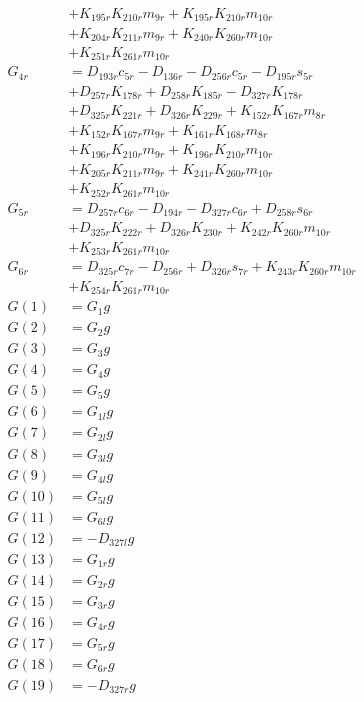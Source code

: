 \begin{multicols}{2}
\begin{align}
&+ K_{195r}K_{210r}m_{9r} + K_{195r}K_{210r}m_{10r}  \nonumber \\
&+ K_{204r}K_{211r}m_{9r} + K_{240r}K_{260r}m_{10r}  \nonumber \\
&+ K_{251r}K_{261r}m_{10r} \nonumber \\
G_{4r} &= D_{193r}c_{5r} - D_{136r} - D_{256r}c_{5r} - D_{195r}s_{5r}  \nonumber \\
&+ D_{257r}K_{178r} + D_{258r}K_{185r} - D_{327r}K_{178r}  \nonumber \\
&+ D_{325r}K_{221r} + D_{326r}K_{229r} + K_{152r}K_{167r}m_{8r}  \nonumber \\
&+ K_{152r}K_{167r}m_{9r} + K_{161r}K_{168r}m_{8r}  \nonumber \\
&+ K_{196r}K_{210r}m_{9r} + K_{196r}K_{210r}m_{10r}  \nonumber \\
&+ K_{205r}K_{211r}m_{9r} + K_{241r}K_{260r}m_{10r}  \nonumber \\
&+ K_{252r}K_{261r}m_{10r} \nonumber \\
G_{5r} &= D_{257r}c_{6r} - D_{194r} - D_{327r}c_{6r} + D_{258r}s_{6r}  \nonumber \\
&+ D_{325r}K_{222r} + D_{326r}K_{230r} + K_{242r}K_{260r}m_{10r}  \nonumber \\
&+ K_{253r}K_{261r}m_{10r} \nonumber \\
G_{6r} &= D_{325r}c_{7r} - D_{256r} + D_{326r}s_{7r} + K_{243r}K_{260r}m_{10r}  \nonumber \\
&+ K_{254r}K_{261r}m_{10r} \nonumber \\
G(1) &= G_{1}g \nonumber \\
G(2) &= G_{2}g \nonumber \\
G(3) &= G_{3}g \nonumber \\
G(4) &= G_{4}g \nonumber \\
G(5) &= G_{5}g \nonumber \\
G(6) &= G_{1l}g \nonumber \\
G(7) &= G_{2l}g \nonumber \\
G(8) &= G_{3l}g \nonumber \\
G(9) &= G_{4l}g \nonumber \\
G(10) &= G_{5l}g \nonumber \\
G(11) &= G_{6l}g \nonumber \\
G(12) &= -D_{327l}g \nonumber \\
G(13) &= G_{1r}g \nonumber \\
G(14) &= G_{2r}g \nonumber \\
G(15) &= G_{3r}g \nonumber \\
G(16) &= G_{4r}g \nonumber \\
G(17) &= G_{5r}g \nonumber \\
G(18) &= G_{6r}g \nonumber \\
G(19) &= -D_{327r}g \nonumber \\
\end{align}
\end{multicols}
